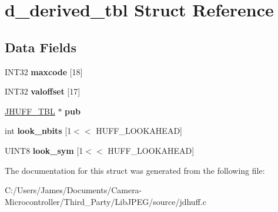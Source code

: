 \hypertarget{structd__derived__tbl}{}\section{d\+\_\+derived\+\_\+tbl Struct Reference}
\label{structd__derived__tbl}
\subsection*{Data Fields}
\begin{DoxyCompactItemize}
\item 
\mbox{\label{structd__derived__tbl_a9853e88b444193233294b8d441038b48}} 
I\+N\+T32 {\bfseries maxcode} \mbox{[}18\mbox{]}
\item 
\mbox{\label{structd__derived__tbl_a2d5e99f43363b033df944496b7c67ce2}} 
I\+N\+T32 {\bfseries valoffset} \mbox{[}17\mbox{]}
\item 
\mbox{\label{structd__derived__tbl_a9a27e5dcf200c732efaa2fa7501119fa}} 
\hyperlink{struct_j_h_u_f_f___t_b_l}{J\+H\+U\+F\+F\+\_\+\+T\+BL} $\ast$ {\bfseries pub}
\item 
\mbox{\label{structd__derived__tbl_afd9b6961c7da64cb91aabfa239336be8}} 
int {\bfseries look\+\_\+nbits} \mbox{[}1$<$$<$ H\+U\+F\+F\+\_\+\+L\+O\+O\+K\+A\+H\+E\+AD\mbox{]}
\item 
\mbox{\label{structd__derived__tbl_a990fc07f13d7caf32843fa5581e0e6d4}} 
U\+I\+N\+T8 {\bfseries look\+\_\+sym} \mbox{[}1$<$$<$ H\+U\+F\+F\+\_\+\+L\+O\+O\+K\+A\+H\+E\+AD\mbox{]}
\end{DoxyCompactItemize}


The documentation for this struct was generated from the following file\+:\begin{DoxyCompactItemize}
\item 
C\+:/\+Users/\+James/\+Documents/\+Camera-\/\+Microcontroller/\+Third\+\_\+\+Party/\+Lib\+J\+P\+E\+G/source/jdhuff.\+c\end{DoxyCompactItemize}
